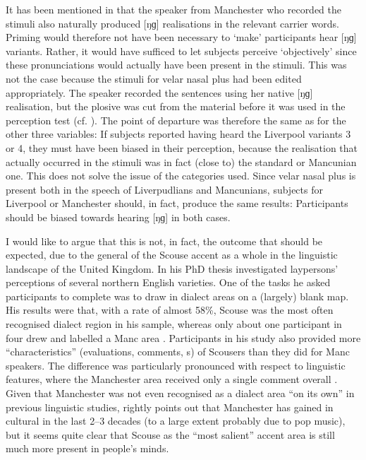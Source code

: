 It has been mentioned in  that the speaker from Manchester who recorded the stimuli also naturally produced [ŋɡ] realisations in the relevant carrier words.
Priming would therefore not have been necessary to `make' participants hear [ŋɡ] variants.
Rather, it would have sufficed to let subjects perceive `objectively' since these pronunciations would actually have been present in the stimuli.
This was not the case because the stimuli for velar nasal plus had been edited appropriately.
The speaker recorded the sentences using her native [ŋɡ] realisation, but the plosive was cut from the material before it was used in the perception test (cf. ).
The point of departure was therefore the same as for the other three variables: If subjects reported having heard the Liverpool variants 3 or 4, they must have been biased in their perception, because the realisation that actually occurred in the stimuli was in fact (close to) the standard or Mancunian one.
This does not solve the issue of the  categories used.
Since velar nasal plus is present both in the speech of Liverpudlians and Mancunians,  subjects for Liverpool or Manchester should, in fact, produce the same results: Participants should be biased towards hearing [ŋɡ] in both cases.

I would like to argue that this is not, in fact, the outcome that should be expected, due to the general  of the Scouse accent as a whole in the linguistic landscape of the United Kingdom.
In his \citeyear{montgomery2007} PhD thesis \citeauthor{montgomery2007} investigated laypersons' perceptions of several northern English varieties.
One of the tasks he asked participants to complete was to draw in dialect areas on a (largely) blank map.
His results were that, with a rate of almost 58\%, Scouse was the most often recognised dialect region in his sample, whereas only about one participant in four drew and labelled a Manc area \parencite[cf.][194]{montgomery2007}.
Participants in his study also provided more ``characteristics'' (evaluations, comments, s) of Scousers than they did for Manc speakers.
The difference was particularly pronounced with respect to linguistic features, where the Manchester area received only a single comment overall \parencite[cf.][246--252]{montgomery2007}.
Given that Manchester was not even recognised as a dialect area ``on its own'' in previous linguistic studies, \textcite[cf.][214--215]{montgomery2007} rightly points out that Manchester has gained in cultural  in the last 2--3 decades (to a large extent probably due to pop music), but it seems quite clear that Scouse as the ``most salient'' \parencite[216]{montgomery2007} accent area is still much more present in people's minds.

